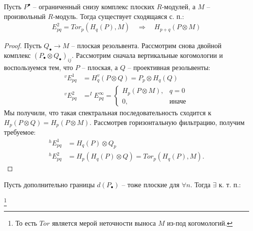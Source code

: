 \documentclass[../main.tex]{subfiles}
\begin{document}
\begin{to_suj}
Пусть $P^{\bullet}$ -- ограниченный снизу комплекс плоских $R$-модулей, а $M$ -- произвольный $R$-модуль. Тогда существует сходящаяся с. п.:
\begin{align*}
    E_{pq}^2 = Tor_p(H_q(P),M)\quad \Rightarrow \quad H_{p+q}(P \otimes M)
\end{align*}
\end{to_suj}
\begin{proof}
Пусть $Q_\bullet \to M$ -- плоская резольвента. Рассмотрим снова двойной комплекс $(P_\bullet\otimes Q_\bullet)_{ij}$. Рассмотрим сначала вертикальные когомологии и воспользуемся тем, что $P$ -- плоская, а $Q$ -- проективная резольвенты:
\begin{align*}
^{v}E_{pq}^1&=H_q^{v}(P\otimes Q) = P_p\otimes H_q(Q)\\
^{v}E_{pq}^2&=^{I}E_{pq}^{\infty} =\begin{cases} H_p(P\otimes M), & q = 0\\ 0, & \text{иначе}\end{cases}
\end{align*}
Мы получили, что такая спектральная последовательность сходится к $H_p(P\otimes Q) = H_p( P\otimes M)$. Рассмотрев горизонтальную фильтрацию, получим требуемое:
\begin{align*}
^{h}E_{pq}^1&= H_q(P)\otimes Q_p\\
^{h}E_{pq}^2&= H_p(H_q(P)\otimes Q) =Tor_p(H_q (P), M).
\end{align*}
\end{proof}
\begin{to_suj}
Пусть дополнительно границы $d(P_\bullet)$ -- тоже плоские для $\forall n$. 
Тогда $\exists$ к. т. п.:
\bee
{}
\eee\footnote{То есть $Tor$ является мерой неточности выноса $M$ из-под когомологий.}
\end{to_suj}
\end{document}
